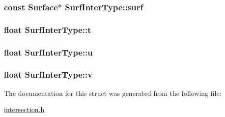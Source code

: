 \subsubsection[{\texorpdfstring{surf}{surf}}]{\setlength{\rightskip}{0pt plus 5cm}const {\bf Surface}$\ast$ Surf\+Inter\+Type\+::surf}\hypertarget{structSurfInterType_a257b9ee9e47864c03a15495d646737e1}{}\label{structSurfInterType_a257b9ee9e47864c03a15495d646737e1}
\subsubsection[{\texorpdfstring{t}{t}}]{\setlength{\rightskip}{0pt plus 5cm}float Surf\+Inter\+Type\+::t}\hypertarget{structSurfInterType_a858293669930005f19a35357f2514752}{}\label{structSurfInterType_a858293669930005f19a35357f2514752}
\subsubsection[{\texorpdfstring{u}{u}}]{\setlength{\rightskip}{0pt plus 5cm}float Surf\+Inter\+Type\+::u}\hypertarget{structSurfInterType_a55d18e6bdaf4d40084f772610ff8c3d2}{}\label{structSurfInterType_a55d18e6bdaf4d40084f772610ff8c3d2}
\subsubsection[{\texorpdfstring{v}{v}}]{\setlength{\rightskip}{0pt plus 5cm}float Surf\+Inter\+Type\+::v}\hypertarget{structSurfInterType_a49f68075edc5d8aa37aef1239ae5ca40}{}\label{structSurfInterType_a49f68075edc5d8aa37aef1239ae5ca40}


The documentation for this struct was generated from the following file\+:\begin{DoxyCompactItemize}
\item 
\hyperlink{intersection_8h}{intersection.\+h}\end{DoxyCompactItemize}
